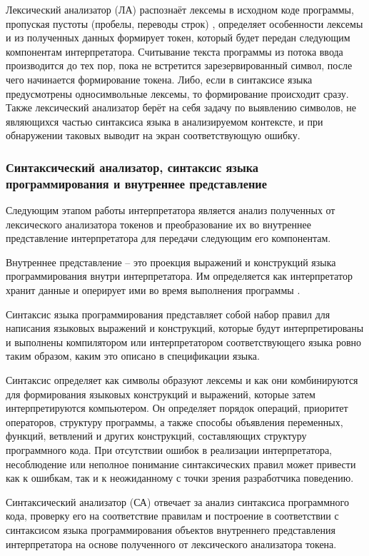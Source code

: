 Лексический анализатор (ЛА) распознаёт лексемы в исходном коде программы, пропуская пустоты (пробелы, переводы строк) \cite{e20}, определяет особенности лексемы и из полученных данных формирует токен, который будет передан следующим компонентам интерпретатора. Считывание текста программы из потока ввода производится до тех пор, пока не встретится зарезервированный символ, после чего начинается формирование токена. Либо, если в синтаксисе языка предусмотрены односимвольные лексемы, то формирование происходит сразу. Также лексический анализатор берёт на себя задачу по выявлению символов, не являющихся частью синтаксиса языка в анализируемом контексте, и при обнаружении таковых выводит на экран соответствующую ошибку.



\subsubsection{Синтаксический анализатор, синтаксис языка программирования и внутреннее представление}

Следующим этапом работы интерпретатора является анализ полученных от лексического анализатора токенов и преобразование их во внутреннее представление интерпретатора для передачи следующим его компонентам.

Внутреннее представление -- это проекция выражений и конструкций языка программирования внутри интерпретатора. Им определяется как интерпретатор хранит данные и оперирует ими во время выполнения программы \cite{e19}.

Синтаксис языка программирования представляет собой набор правил для написания языковых выражений и конструкций, которые будут интерпретированы и выполнены компилятором или интерпретатором соответствующего языка ровно таким образом, каким это описано в спецификации языка.

Синтаксис определяет как символы образуют лексемы и как они комбинируются для формирования языковых конструкций и выражений, которые затем интерпретируются компьютером. Он определяет порядок операций, приоритет операторов, структуру программы, а также способы объявления переменных, функций, ветвлений и других конструкций, составляющих структуру программного кода. При отсутствии ошибок в реализации интерпретатора, несоблюдение или неполное понимание синтаксических правил может привести как к ошибкам, так и к неожиданному с точки зрения разработчика поведению.

Синтаксический анализатор (СА) отвечает за анализ синтаксиса программного кода, проверку его на соответствие правилам и построение в соответствии с синтаксисом языка программирования объектов внутреннего представления интерпретатора на основе полученного от лексического анализатора токена.

